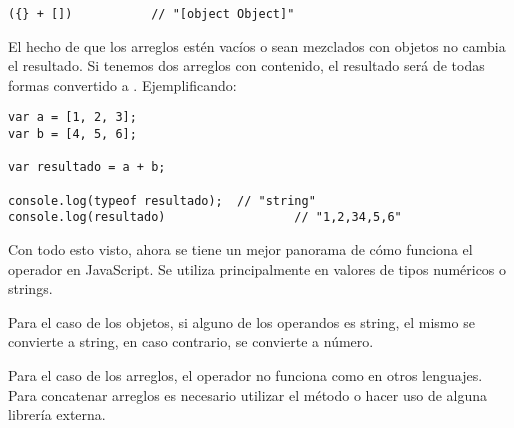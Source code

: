 \begin{lstlisting}[title={Caso especial}]
({} + [])			// "[object Object]"
\end{lstlisting}

El hecho de que los arreglos estén vacíos o sean mezclados con objetos no cambia el resultado. Si tenemos dos arreglos con contenido, el resultado será de todas formas convertido a . Ejemplificando:

\begin{lstlisting}[title={Operador \code{+} entre arreglos}]
var a = [1, 2, 3];
var b = [4, 5, 6];

var resultado = a + b;

console.log(typeof resultado);	// "string​​​​​"
console.log(resultado)					// "1,2,34,5,6"
\end{lstlisting}

Con todo esto visto, ahora se tiene un mejor panorama de cómo funciona el operador \code{+} en JavaScript. Se utiliza principalmente en valores de tipos numéricos o strings. 

Para el caso de los objetos, si alguno de los operandos es string, el mismo se convierte a string, en caso contrario, se convierte a número. 

Para el caso de los arreglos, el operador \code{+} no funciona como en otros lenguajes. Para concatenar arreglos es necesario utilizar el método  o hacer uso de alguna librería externa. 